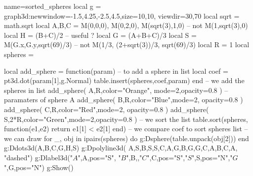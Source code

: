 \documentclass[border=2 mm]{standalone}
\begin{document}
\begin{luadraw}{name=sorted_spheres}
local g = graph3d:new{window={-1.5,4.25,-2.5,4.5},size={10,10}, viewdir={30,70}}
local sqrt = math.sqrt
local A,B,C = M(0,0,0), M(0,2,0), M(sqrt(3),1,0) -- not M(1,sqrt(3),0)
local H = (B+C)/2 -- useful ?
local G = (A+B+C)/3
local S = M(G.x,G.y,sqrt(69)/3) -- not M(1/3, (2+sqrt(3))/3, sqrt(69)/3)
local R = 1
local spheres = {}

local add_sphere = function(param) -- to add a sphere in list
    local coef = pt3d.dot(param[1],g.Normal)
    table.insert(spheres,{coef,param})
end
-- we add the spheres in list
add_sphere( {A,R,{color="Orange", mode=2,opacity=0.8}} ) -- paramaters of sphere A
add_sphere( {B,R,{color="Blue",mode=2, opacity=0.8}} )
add_sphere( {C,R,{color="Red",mode=2, opacity=0.8}} )
add_sphere( {S,2*R,{color="Green",mode=2,opacity=0.8}} )
-- we sort the list
table.sort(spheres, function(e1,e2) return e1[1] < e2[1] end)  -- we compare coef to sort spheres list
-- we can draw
for _, obj in ipairs(spheres) do
    g:Dsphere(table.unpack(obj[2]))
end
g:Ddots3d({A,B,C,G,H,S})
g:Dpolyline3d( {{A,S},{B,S},{S,C},{A,G},{B,G},{G,C},{A,B,C,A}}, "dashed")
g:Dlabel3d("$A$",A,{pos="S"}, "$B$",B,{},"$C$",C,{pos="S"},"$S$",S,{pos="N"},"$G$",G,{pos="N"})
g:Show()
\end{luadraw}
\end{document}
